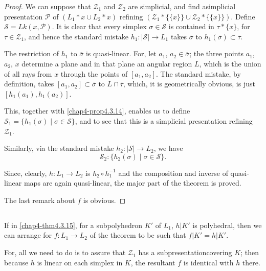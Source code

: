 \begin{proof}
We can suppose that $\mathscr{Z}_{1}$ and $\mathscr{Z}_{2}$ are simplicial, and find a\pageoriginale simplicial presentation $\mathscr{P}$ of $(L_{1}\ast x\cup L_{2}\ast x)$ refining $(\mathscr{Z}_{1}\ast\{\{x\}\}\cup \mathscr{Z}_{2}\ast\{\{x\}\})$. Define $\mathscr{S}=Lk(x,\mathscr{P})$. It is clear that every simplex $\sigma\in \mathscr{S}$ is contained in $\tau\ast\{x\}$, for $\tau\in \mathscr{Z}_{1}$, and hence the standard mistake $h_{1}:|\mathscr{S}|\to L_{1}$ takes $\overline{\sigma}$ to $h_{1}(\overline{\sigma})\subset \overline{\tau}$.

The restriction of $h_{1}$ to $\overline{\sigma}$ is quasi-linear. For, let $a_{1}$, $a_{2}\in\overline{\sigma}$; the three points $a_{1}$, $a_{2}$, $x$ determine a plane and in that plane an angular region $L$, which is the union of all rays from $x$ through the points of $[a_{1},a_{2}]$. The standard mistake, by definition, takes $[a_{1},a_{2}]\subset\overline{\sigma}$ to $L\cap \overline{\tau}$, which, it is geometrically obvious, is just $[h_{1}(a_{1}), h_{1}(a_{2})]$.

This, together with \ref{chap4-prop4.3.14}, enables us to define $\mathscr{S}_{1}=\{h_{1}(\sigma)\mid \sigma\in\mathscr{S}\}$, and to see that this is a simplicial presentation refining $\mathscr{Z}_{1}$.

Similarly, via the standard mistake $h_{2}:|\mathscr{S}|\to L_{2}$, we have
$$
\mathscr{S}_{2}:\{h_{2}(\sigma)\mid \sigma \in \mathscr{S}\}.
$$

Since, clearly, $h:L_{1}\to L_{2}$ is $h_{2}  \circ h^{-1}_{1}$ and the composition and inverse of quasi-linear maps are again quasi-linear, the major part of the theorem is proved.

The last remark about $f$ is obvious.
\end{proof}

\setcounter{subsection}{15}
\subsection{}\label{chap4-sec4.3.16}
If in \ref{chap4-thm4.3.15}, for a subpolyhedron $K'$ of $L_{1}$, $h|K'$ is polyhedral, then we can arrange for $f:L_{1}\to L_{2}$ of the theorem to be such that $f|K'=h|K'$.

For, all we need to do is to assure that $\mathscr{Z}_{1}$ has a subpresentation\pageoriginale covering $K$; then because $h$ is linear on each simplex in $K$, the resultant $f$ is identical with $h$ there.

